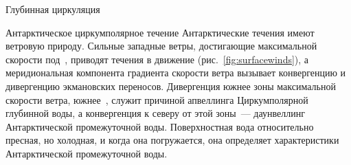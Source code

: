 \begin{chapter}{Глубинная циркуляция}
\begin{section}{Антарктическое циркумполярное течение}
Антарктические течения имеют ветровую природу. Сильные западные ветры,
достигающие максимальной скорости под~, приводят течения
в движение (рис.~\ref{fig:surfacewinds}), а меридиональная компонента 
градиента скорости ветра вызывает конвергенцию и дивергенцию экмановских
переносов. Дивергенция южнее зоны максимальной
скорости ветра, южнее~, служит причиной апвеллинга%
 Циркумполярной глубинной
воды, а конвергенция к северу от этой зоны~--- даунвеллинг Антарктической
промежуточной воды. Поверхностная вода относительно пресная, но холодная,
и когда она погружается, она определяет характеристики Антарктической
промежуточной воды.
%


\end{section}
\end{chapter}

